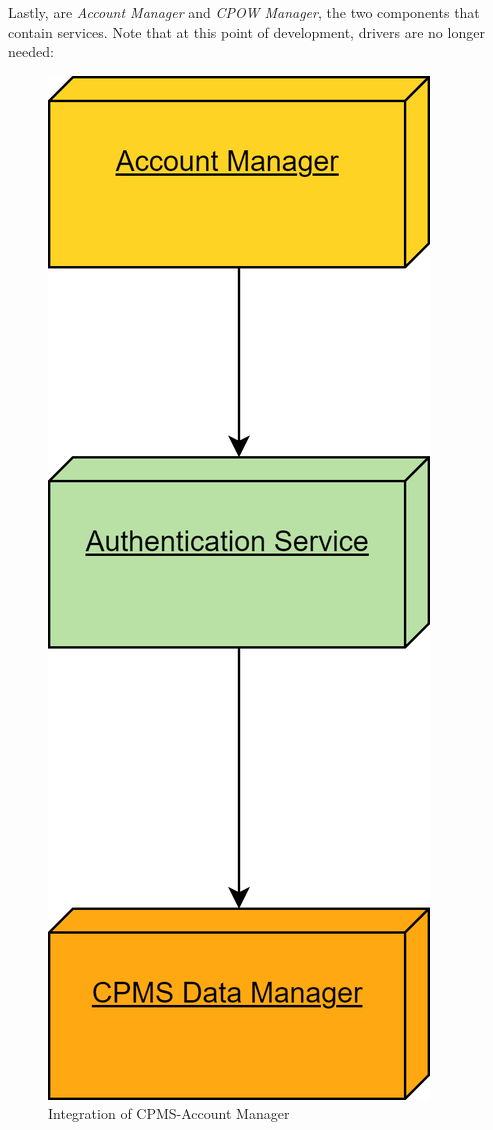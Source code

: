 \documentclass[table, 12pt]{article}
\begin{document}
Lastly, are \emph{Account Manager} and \emph{CPOW Manager}, the two components that contain services. Note that at this point of development, drivers are no longer needed:

\begin{figure}[H]
    \centering
    \includegraphics[scale=0.6]{assets/Integration Diagrams/CPMS-Account Manager.png} 
    \caption{Integration of CPMS-Account Manager}%
    \label{fig: CPMS-Account Manager}%
\end{figure}
\end{document}
